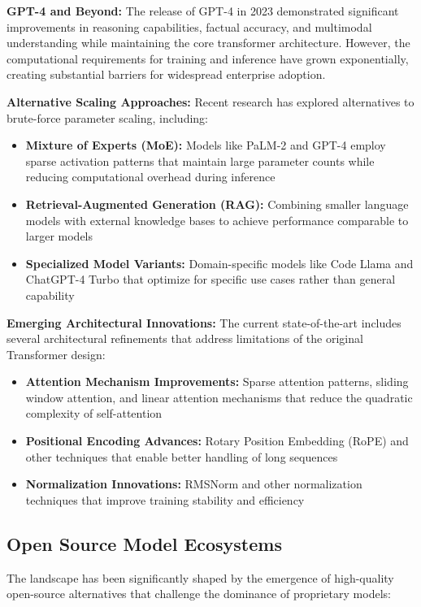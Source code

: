 \textbf{GPT-4 and Beyond:} The release of GPT-4 in 2023 demonstrated significant improvements in reasoning capabilities, factual accuracy, and multimodal understanding while maintaining the core transformer architecture. However, the computational requirements for training and inference have grown exponentially, creating substantial barriers for widespread enterprise adoption.

\textbf{Alternative Scaling Approaches:} Recent research has explored alternatives to brute-force parameter scaling, including:
\begin{itemize}
    \item \textbf{Mixture of Experts (MoE):} Models like PaLM-2 and GPT-4 employ sparse activation patterns that maintain large parameter counts while reducing computational overhead during inference
    \item \textbf{Retrieval-Augmented Generation (RAG):} Combining smaller language models with external knowledge bases to achieve performance comparable to larger models
    \item \textbf{Specialized Model Variants:} Domain-specific models like Code Llama and ChatGPT-4 Turbo that optimize for specific use cases rather than general capability
\end{itemize}

\textbf{Emerging Architectural Innovations:} The current state-of-the-art includes several architectural refinements that address limitations of the original Transformer design:
\begin{itemize}
    \item \textbf{Attention Mechanism Improvements:} Sparse attention patterns, sliding window attention, and linear attention mechanisms that reduce the quadratic complexity of self-attention
    \item \textbf{Positional Encoding Advances:} Rotary Position Embedding (RoPE) and other techniques that enable better handling of long sequences
    \item \textbf{Normalization Innovations:} RMSNorm and other normalization techniques that improve training stability and efficiency
\end{itemize}

\subsection{Open Source Model Ecosystems}

The landscape has been significantly shaped by the emergence of high-quality open-source alternatives that challenge the dominance of proprietary models:

